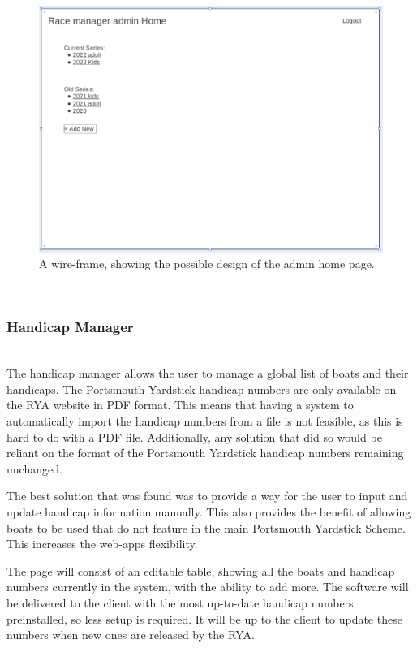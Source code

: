\documentclass{l4proj}
\begin{document}
\begin{figure}[h!]
    \centering
    \includegraphics[width=1\linewidth]{images/admin home 2.png} 

    \caption{A wire-frame, showing the possible design of the admin home page.
    }

    \label{fig:adminHomeWF}
\end{figure}

\hfill\\
\subsubsection{Handicap Manager}
\hfill\\
The handicap manager allows the user to manage a global list of boats and their handicaps. The Portsmouth Yardstick handicap numbers are only available on the RYA website in PDF format. This means that having a system to automatically import the handicap numbers from a file is not feasible, as this is hard to do with a PDF file. Additionally, any solution that did so would be reliant on the format of the Portsmouth Yardstick handicap numbers remaining unchanged.

The best solution that was found was to provide a way for the user to input and update handicap information manually. This also provides the benefit of allowing boats to be used that do not feature in the main Portsmouth Yardstick Scheme. This increases the web-apps flexibility.

The page will consist of an editable table, showing all the boats and handicap numbers currently in the system, with the ability to add more. The software will be delivered to the client with the most up-to-date handicap numbers preinstalled, so less setup is required. It will be up to the client to update these numbers when new ones are released by the RYA.
\end{document}

